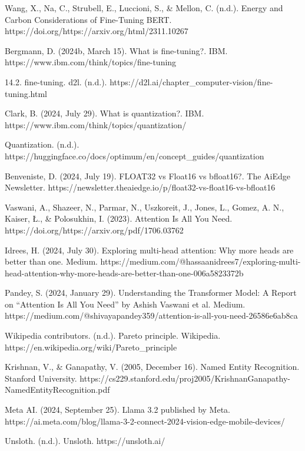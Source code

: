 \documentclass[licencjacka,en]{pracamgr}
\begin{document}
\begin{thebibliography}{99}
Wang, X., Na, C., Strubell, E., Luccioni, S., \& Mellon, C. (n.d.). Energy and Carbon Considerations of Fine-Tuning BERT. https://doi.org/https://arxiv.org/html/2311.10267 

Bergmann, D. (2024b, March 15). What is fine-tuning?. IBM. https://www.ibm.com/think/topics/fine-tuning 

14.2. fine-tuning. d2l. (n.d.). https://d2l.ai/chapter\_computer-vision/fine-tuning.html 

Clark, B. (2024, July 29). What is quantization?. IBM. https://www.ibm.com/think/topics/quantization/ 

Quantization. (n.d.). https://huggingface.co/docs/optimum/en/concept\_guides/quantization 

Benveniste, D. (2024, July 19). FLOAT32 vs Float16 vs bfloat16?. The AiEdge Newsletter. https://newsletter.theaiedge.io/p/float32-vs-float16-vs-bfloat16 

Vaswani, A., Shazeer, N., Parmar, N., Uszkoreit, J., Jones, L., Gomez, A. N., Kaiser, Ł., \& Polosukhin, I. (2023). Attention Is All You Need. https://doi.org/https://arxiv.org/pdf/1706.03762 

Idrees, H. (2024, July 30). Exploring multi-head attention: Why more heads are better than one. Medium. https://medium.com/@hassaanidrees7/exploring-multi-head-attention-why-more-heads-are-better-than-one-006a5823372b

Pandey, S. (2024, January 29). Understanding the Transformer Model: A Report on “Attention Is All You Need” by Ashish Vaswani et al. Medium. https://medium.com/@shivayapandey359/attention-is-all-you-need-26586e6ab8ca

Wikipedia contributors. (n.d.). Pareto principle. Wikipedia. https://en.wikipedia.org/wiki/Pareto\_principle

Krishnan, V., \& Ganapathy, V. (2005, December 16). Named Entity Recognition. Stanford University. https://cs229.stanford.edu/proj2005/KrishnanGanapathy-NamedEntityRecognition.pdf

Meta AI. (2024, September 25). Llama 3.2 published by Meta. https://ai.meta.com/blog/llama-3-2-connect-2024-vision-edge-mobile-devices/

Unsloth. (n.d.). Unsloth. https://unsloth.ai/


\end{thebibliography}
\end{document}
